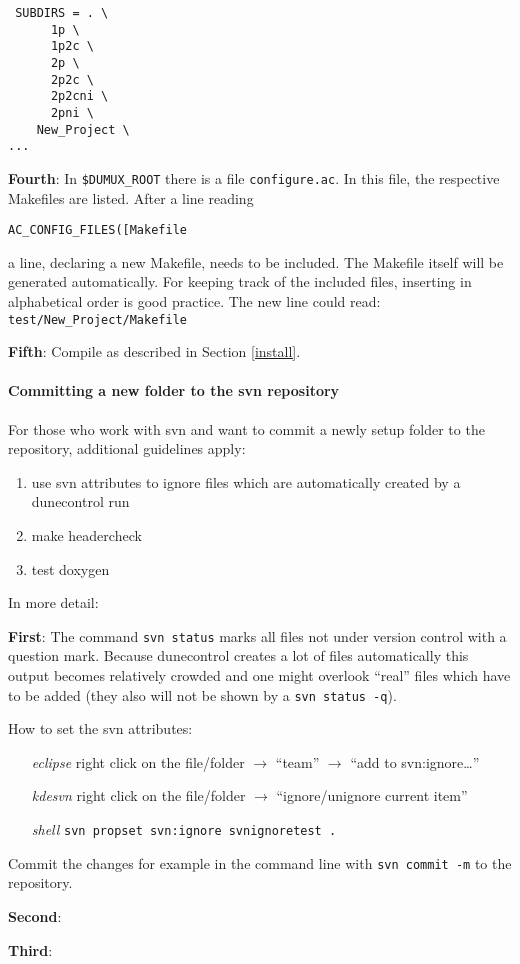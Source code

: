 \begin{verbatim}
 SUBDIRS = . \
	  1p \
	  1p2c \
	  2p \
	  2p2c \
	  2p2cni \
	  2pni \
	New_Project \
...
\end{verbatim}

\textbf{Fourth}: In \verb+$DUMUX_ROOT+ there is a file \verb+configure.ac+. In this file, the respective Makefiles are listed. After a line reading

 \verb+AC_CONFIG_FILES([Makefile+ 

 \noindent a line, declaring a new Makefile, needs to be included. The Makefile itself will be generated automatically. For keeping track of the included files, inserting in alphabetical order is good practice. The new line could read: \verb+test/New_Project/Makefile+ 

\textbf{Fifth}: Compile \Dumux as described in Section \ref{install}.

\paragraph{Committing a new folder to the svn repository}
For those who work with svn and want to commit a newly setup folder to the repository, additional guidelines apply:

\begin{enumerate}
 \item use svn attributes to ignore files which are automatically created by a dunecontrol run
 \item make headercheck
 \item test doxygen
\end{enumerate}

\noindent In more detail:

\textbf{First}: The command \verb+svn status+ marks all files not under version control with a question mark. Because dunecontrol creates a lot of files automatically this output becomes relatively crowded and one might overlook ``real'' files which have to be added (they also will not be shown by a \verb+svn status -q+).

How to set the svn attributes:
\begin{itemize}
 \item[{\em eclipse}] right click on the file/folder $\rightarrow$ ``team'' $\rightarrow$ ``add to svn:ignore\dots''
 \item[{\em kdesvn}] right click on the file/folder $\rightarrow$ ``ignore/unignore current item''
 \item[{\em shell}] \verb+svn propset svn:ignore svnignoretest .+
\end{itemize}
Commit the changes for example in the command line with \verb+svn commit -m+ to the repository.



\textbf{Second}:

\textbf{Third}: